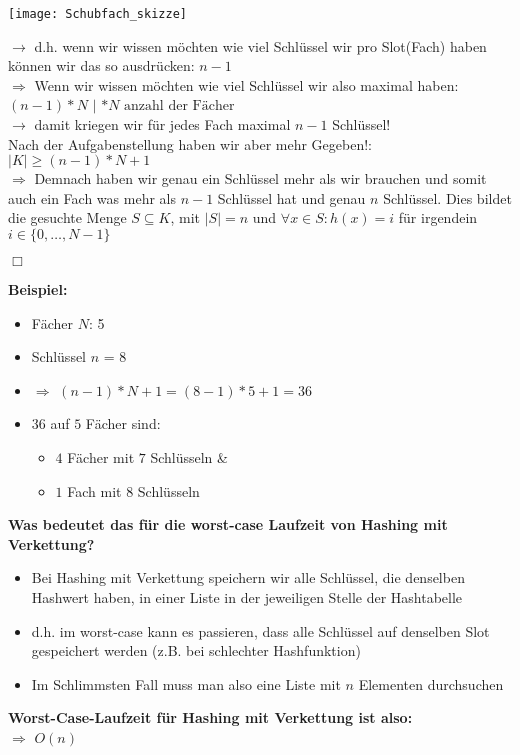 \begin{center}
\texttt{[image: Schubfach\_skizze]}
\end{center}

$\rightarrow$ d.h. wenn wir wissen möchten wie viel Schlüssel wir pro Slot(Fach) haben können wir das so ausdrücken: $n-1$\\

$\Rightarrow$ Wenn wir wissen möchten wie viel Schlüssel wir also maximal haben: $(n-1) * N$ $|$ $*N \text{ anzahl der Fächer}$\\
$\rightarrow$ damit kriegen wir für jedes Fach maximal $n-1$ Schlüssel!\\
Nach der Aufgabenstellung haben wir aber mehr Gegeben!:\\

$|K| \geq (n-1)*N+1$\\

\noindent
$\Rightarrow$ Demnach haben wir genau ein Schlüssel mehr als wir brauchen und somit auch ein Fach was mehr als $n-1$ Schlüssel hat und genau $n$ Schlüssel. Dies bildet die gesuchte Menge $S \subseteq K$, mit $|S|=n$ und $\forall x \in S:h(x)=i$ für irgendein $i \in \{0, \dots, N-1\}$\\
\begin{flushright}
$\Box$
\end{flushright}

\noindent
\textbf{Beispiel:}
\begin{itemize}
	\item Fächer $N$: 5
	\item Schlüssel $n$ = 8
	\item $\Rightarrow$ $(n-1)*N+1=(8-1)*5+1=36$
	\item $36$ auf $5$ Fächer sind:
	\begin{itemize}
		\item $4$ Fächer mit $7$ Schlüsseln \&
		\item $1$ Fach mit $8$ Schlüsseln\\
	\end{itemize}
\end{itemize}

\noindent
\textbf{Was bedeutet das für die worst-case Laufzeit von Hashing mit Verkettung?}

\begin{itemize}
	\item Bei Hashing mit Verkettung speichern wir alle Schlüssel, die denselben Hashwert haben, in einer Liste in der jeweiligen Stelle der Hashtabelle
	\item d.h. im worst-case kann es passieren, dass alle Schlüssel auf denselben Slot gespeichert werden (z.B. bei schlechter Hashfunktion)
	\item Im Schlimmsten Fall muss man also eine Liste mit $n$ Elementen durchsuchen
\end{itemize}
\textbf{Worst-Case-Laufzeit für Hashing mit Verkettung ist also:}\\
$\Rightarrow$ $O(n)$\\


